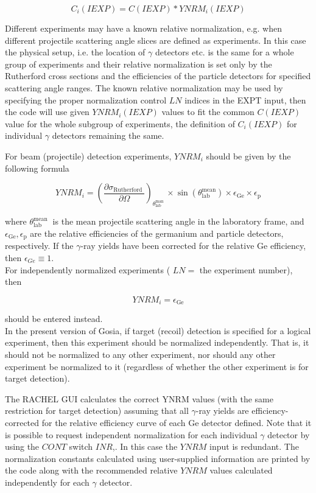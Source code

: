 \documentclass[10pt]{article}
\begin{document}
$$
C_{i}(I E X P)=C(I E X P) * Y N R M_{i}(I E X P)
$$

Different experiments may have a known relative normalization, e.g. when different projectile scattering angle slices are defined as experiments. In this case the physical setup, i.e. the location of $\gamma$ detectors etc. is the same for a whole group of experiments and their relative normalization is set only by the Rutherford cross sections and the efficiencies of the particle detectors for specified scattering angle ranges. The known relative normalization may be used by specifying the proper normalization control $L N$ indices in the EXPT input, then the code will use given $Y N R M_{i}(I E X P)$ values to fit the common $C(I E X P)$ value for the whole subgroup of experiments, the definition of $C_{i}(I E X P)$ for individual $\gamma$ detectors remaining the same.

For beam (projectile) detection experiments, $Y N R M_{i}$ should be given by the following formula

$$
Y N R M_{i}=\left(\frac{\partial \sigma_{\text {Rutherford }}}{\partial \Omega}\right)_{\theta_{\mathrm{lab}}^{\text {man }}} \times \sin \left(\theta_{\mathrm{lab}}^{\mathrm{mean}}\right) \times \epsilon_{\mathrm{Ge}} \times \epsilon_{\mathrm{p}}
$$

where $\theta_{\text {lab }}^{\text {mean }}$ is the mean projectile scattering angle in the laboratory frame, and $\epsilon_{\mathrm{Ge}}, \epsilon_{\mathrm{p}}$ are the relative efficiencies of the germanium and particle detectors, respectively. If the $\gamma$-ray yields have been corrected for the relative Ge efficiency, then $\epsilon_{G e} \equiv 1$.\\
For independently normalized experiments ( $L N=$ the experiment number), then


\begin{equation*}
Y N R M_{i}=\epsilon_{\mathrm{Ge}} \tag{7.5}
\end{equation*}


should be entered instead.\\
In the present version of Gosia, if target (recoil) detection is specified for a logical experiment, then this experiment should be normalized independently. That is, it should not be normalized to any other experiment, nor should any other experiment be normalized to it (regardless of whether the other experiment is for target detection).

The RACHEL GUI calculates the correct YNRM values (with the same restriction for target detection) assuming that all $\gamma$-ray yields are efficiency-corrected for the relative efficiency curve of each Ge detector defined. Note that it is possible to request independent normalization for each individual $\gamma$ detector by using the $C O N T$ switch $I N R$,. In this case the $Y N R M$ input is redundant. The normalization constants calculated using user-supplied information are printed by the code along with the recommended relative $Y N R M$ values calculated independently for each $\gamma$ detector.
\end{document}
